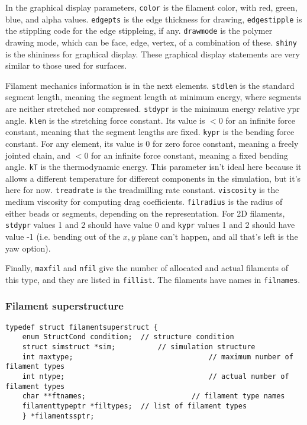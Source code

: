 \documentclass {scrbook}
\newcommand {\ttt} {\texttt}
\begin{document}
In the graphical display parameters, \ttt{color} is the filament color, with red, green, blue, and alpha values. \ttt{edgepts} is the edge thickness for drawing, \ttt{edgestipple} is the stippling code for the edge stippleing, if any. \ttt{drawmode} is the polymer drawing mode, which can be face, edge, vertex, of a combination of these. \ttt{shiny} is the shininess for graphical display. These graphical display statements are very similar to those used for surfaces.

Filament mechanics information is in the next elements. \ttt{stdlen} is the standard segment length, meaning the segment length at minimum energy, where segments are neither stretched nor compressed. \ttt{stdypr} is the minimum energy relative ypr angle. \ttt{klen} is the stretching force constant. Its value is $< 0$ for an infinite force constant, meaning that the segment lengths are fixed. \ttt{kypr} is the bending force constant. For any element, its value is 0 for zero force constant, meaning a freely jointed chain, and $< 0$ for an infinite force constant, meaning a fixed bending angle. \ttt{kT} is the thermodynamic energy. This parameter isn't ideal here because it allows a different temperature for different components in the simulation, but it's here for now. \ttt{treadrate} is the treadmilling rate constant. \ttt{viscosity} is the medium viscosity for computing drag coefficients. \ttt{filradius} is the radius of either beads or segments, depending on the representation. For 2D filaments, \ttt{stdypr} values 1 and 2 should have value 0 and \ttt{kypr} values 1 and 2 should have value -1 (i.e. bending out of the $x,y$ plane can't happen, and all that's left is the yaw option).

Finally, \ttt{maxfil} and \ttt{nfil} give the number of allocated and actual filaments of this type, and they are listed in \ttt{fillist}. The filaments have names in \ttt{filnames}.\\

\subsubsection*{Filament superstructure}

\begin{lstlisting}
typedef struct filamentsuperstruct {
	enum StructCond condition;	// structure condition
	struct simstruct *sim;			// simulation structure
	int maxtype;								// maximum number of filament types
	int ntype;									// actual number of filament types
	char **ftnames;							// filament type names
	filamenttypeptr *filtypes;	// list of filament types
	} *filamentssptr;
\end{lstlisting}
\end{document}
